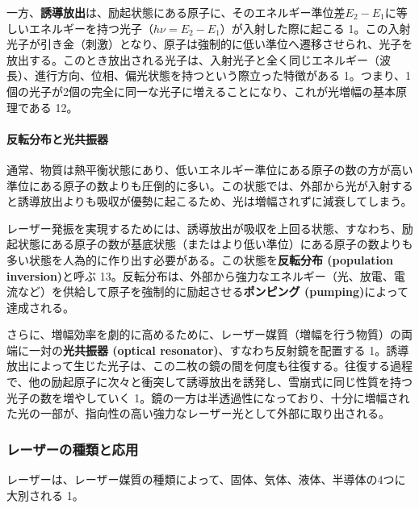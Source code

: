 \documentclass[11pt,a4paper]{ltjsarticle}
\begin{document}
一方、\textbf{誘導放出}は、励起状態にある原子に、そのエネルギー準位差$E_2 - E_1$に等しいエネルギーを持つ光子（$h\nu = E_2 - E_1$）が入射した際に起こる 1。この入射光子が引き金（刺激）となり、原子は強制的に低い準位へ遷移させられ、光子を放出する。このとき放出される光子は、入射光子と全く同じエネルギー（波長）、進行方向、位相、偏光状態を持つという際立った特徴がある 1。つまり、1個の光子が2個の完全に同一な光子に増えることになり、これが光増幅の基本原理である 12。

\paragraph{反転分布と光共振器}

通常、物質は熱平衡状態にあり、低いエネルギー準位にある原子の数の方が高い準位にある原子の数よりも圧倒的に多い。この状態では、外部から光が入射すると誘導放出よりも吸収が優勢に起こるため、光は増幅されずに減衰してしまう。

レーザー発振を実現するためには、誘導放出が吸収を上回る状態、すなわち、励起状態にある原子の数が基底状態（またはより低い準位）にある原子の数よりも多い状態を人為的に作り出す必要がある。この状態を\textbf{反転分布 (population inversion)}と呼ぶ 13。反転分布は、外部から強力なエネルギー（光、放電、電流など）を供給して原子を強制的に励起させる\textbf{ポンピング (pumping)}によって達成される。

さらに、増幅効率を劇的に高めるために、レーザー媒質（増幅を行う物質）の両端に一対の\textbf{光共振器 (optical resonator)}、すなわち反射鏡を配置する 1。誘導放出によって生じた光子は、この二枚の鏡の間を何度も往復する。往復する過程で、他の励起原子に次々と衝突して誘導放出を誘発し、雪崩式に同じ性質を持つ光子の数を増やしていく 1。鏡の一方は半透過性になっており、十分に増幅された光の一部が、指向性の高い強力なレーザー光として外部に取り出される。

\subsubsection*{レーザーの種類と応用}

レーザーは、レーザー媒質の種類によって、固体、気体、液体、半導体の4つに大別される 1。
\end{document}
